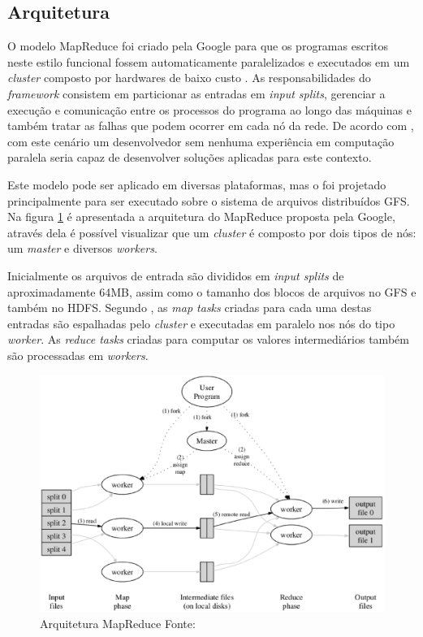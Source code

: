 \subsection{Arquitetura}

O modelo MapReduce foi criado pela Google para que os programas escritos neste estilo funcional fossem automaticamente paralelizados e executados em um \textit{cluster} composto por hardwares de baixo custo \cite{ghemawatMapreduce2008}. As responsabilidades do \textit{framework} consistem em particionar as entradas em \textit{input splits}, gerenciar a execução e comunicação entre os processos do programa ao longo das máquinas e também tratar as falhas que podem ocorrer em cada nó da rede. De acordo com , com este cenário um desenvolvedor sem nenhuma experiência em computação paralela seria capaz de desenvolver soluções aplicadas para este contexto. 

Este modelo pode ser aplicado em diversas plataformas, mas o foi projetado principalmente para ser executado sobre o sistema de arquivos distribuídos GFS. Na figura \ref{fig-mapreduce-google} é apresentada a arquitetura do MapReduce proposta pela Google, através dela é possível visualizar que um \textit{cluster} é composto por dois tipos de nós: um \textit{master} e diversos \textit{workers}.

Inicialmente os arquivos de entrada são divididos em \textit{input splits} de aproximadamente 64MB, assim como o tamanho dos blocos de arquivos no GFS e também no HDFS. Segundo , as \textit{map tasks} criadas para cada uma destas entradas são espalhadas pelo \textit{cluster} e executadas em paralelo nos nós do tipo \textit{worker}. As \textit{reduce tasks} criadas para computar os valores intermediários também são processadas em \textit{workers}.

\begin{figure}[ht!]
	\centering
	\includegraphics[keepaspectratio=true,scale=0.5]
	  {figuras/mapreduce-google.eps}
	\caption[Arquitetura MapReduce]{Arquitetura MapReduce
	\protect\linebreak Fonte: \cite{ghemawatMapreduce2008}}
	\label{fig-mapreduce-google}
\end{figure}
\FloatBarrier

